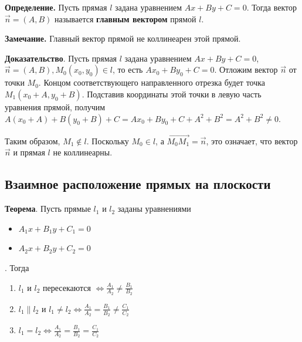 \documentclass[a4paper]{article}
\begin{document}
    \textbf{Определение.} Пусть прямая $l$ задана уравнением $Ax + By + C = 0$. Тогда вектор $\vec{n} = (A, B)$ называется \textbf{главным вектором} прямой $l$.

    \begin{htheorem}
        \textbf{Замечание.} Главный вектор прямой не коллинеарен этой прямой.
    \end{htheorem}


    \begin{hproof}
        \textbf{Доказательство}. Пусть прямая $l$ задана уравнением $Ax + By + C = 0$, $\vec{n} = (A, B), M_0 (x_0, y_0) \in l$, то есть $Ax_0 + By_0 + C = 0$. Отложим вектор $\vec{n}$ от точки $M_0$. Концом соответствующего направленного отрезка будет точка $M_1(x_0 + A, y_0 + B)$. Подставив координаты этой точки в левую часть уравнения прямой, получим $A (x_0 + A) + B(y_0 + B) + C = Ax_0 + By_0 + C + A^2 + B^2 = A^2 + B^2 \neq 0$.

        Таким образом, $M_1 \notin l$. Поскольку $M_0 \in l$, а $\overrightarrow{M_0 M_1} = \vec{n}$, это означает, что вектор $\vec{n}$ и прямая $l$ не коллинеарны.

    \end{hproof}

    \newpage \begin{center}
                 \begin{Large}
                 \end{Large}
    \end{center}
    \subsection*{Взаимное расположение прямых на плоскости}


    \begin{htheorem}
        \textbf{Теорема}. Пусть прямые $l_1$ и $l_2$ заданы уравнениями \begin{itemize}
                                                                            \item $A_1x+B_1y+C_1 = 0$
                                                                            \item $A_2x+B_2y+C_2 = 0$
        \end{itemize}. Тогда \begin{enumerate}
                                 \item $l_1$ и $l_2$ пересекаются $\displaystyle \Leftrightarrow \frac{A_1}{A_2} \neq \frac{B_1}{B_2}$
                                 \item $\displaystyle l_1 \parallel l_2$ и $\displaystyle l_1 \neq l_2 \Leftrightarrow \frac{A_1}{A_2} = \frac{B_1}{B_2} \neq \frac{C_1}{C_2}$
                                 \item $\displaystyle l_1 = l_2 \Leftrightarrow \frac{A_1}{A_2} = \frac{B_1}{B_2} = \frac{C_1}{C_2}$
        \end{enumerate}
    \end{htheorem}
\end{document}
